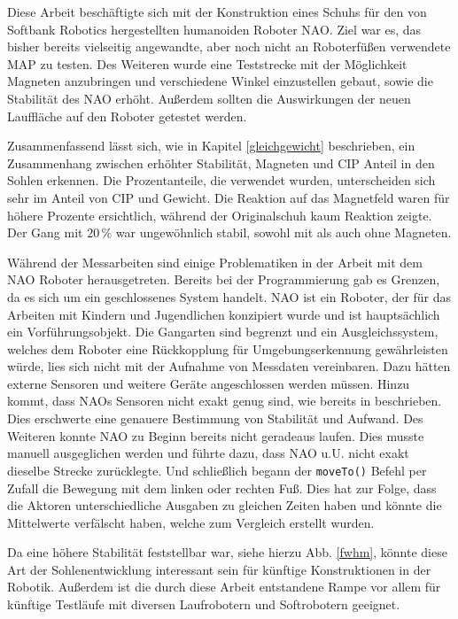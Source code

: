 Diese Arbeit beschäftigte sich mit der Konstruktion eines Schuhs für den von Softbank Robotics hergestellten humanoiden Roboter NAO. Ziel war es, das bisher bereits vielseitig angewandte, aber noch nicht an Roboterfüßen verwendete MAP zu testen. Des Weiteren wurde eine Teststrecke mit der Möglichkeit Magneten anzubringen und verschiedene Winkel einzustellen gebaut, sowie die Stabilität des NAO erhöht. Außerdem sollten die Auswirkungen der neuen Lauffläche auf den Roboter getestet werden. 

Zusammenfassend lässt sich, wie in Kapitel \ref{gleichgewicht} beschrieben, ein Zusammenhang zwischen erhöhter Stabilität, Magneten und CIP Anteil in den Sohlen erkennen. Die Prozentanteile, die verwendet wurden, unterscheiden sich sehr im Anteil von CIP und Gewicht. Die Reaktion auf das Magnetfeld waren für höhere Prozente ersichtlich, während der Originalschuh kaum Reaktion zeigte. Der Gang mit $20\,\%$ war ungewöhnlich stabil, sowohl mit als auch ohne Magneten. 

Während der Messarbeiten sind einige Problematiken in der Arbeit mit dem NAO Roboter herausgetreten. Bereits bei der Programmierung gab es Grenzen, da es sich um ein geschlossenes System handelt. NAO ist ein Roboter, der für das Arbeiten mit Kindern und Jugendlichen konzipiert wurde und ist hauptsächlich ein Vorführungsobjekt. Die Gangarten sind begrenzt und ein Ausgleichssystem, welches dem Roboter eine Rückkopplung für Umgebungserkennung gewährleisten würde, lies sich nicht mit der Aufnahme von Messdaten vereinbaren. Dazu hätten externe Sensoren und weitere Geräte angeschlossen werden müssen. Hinzu kommt, dass NAOs Sensoren nicht exakt genug sind, wie bereits in \cite{pressure_shoe} beschrieben. Dies erschwerte eine genauere Bestimmung von Stabilität und Aufwand. Des Weiteren konnte NAO zu Beginn bereits nicht geradeaus laufen. Dies musste manuell ausgeglichen werden und führte dazu, dass NAO u.U. nicht exakt dieselbe Strecke zurücklegte. Und schließlich begann der \texttt{moveTo()} Befehl per Zufall die Bewegung mit dem linken oder rechten Fuß. Dies hat zur Folge, dass die Aktoren unterschiedliche Ausgaben zu gleichen Zeiten haben und könnte die Mittelwerte verfälscht haben, welche zum Vergleich erstellt wurden. 

Da eine höhere Stabilität feststellbar war, siehe hierzu Abb. \ref{fwhm}, könnte diese Art der Sohlenentwicklung interessant sein für künftige Konstruktionen in der Robotik. Außerdem ist die durch diese Arbeit entstandene Rampe vor allem für künftige Testläufe mit diversen Laufrobotern und Softrobotern geeignet. 

